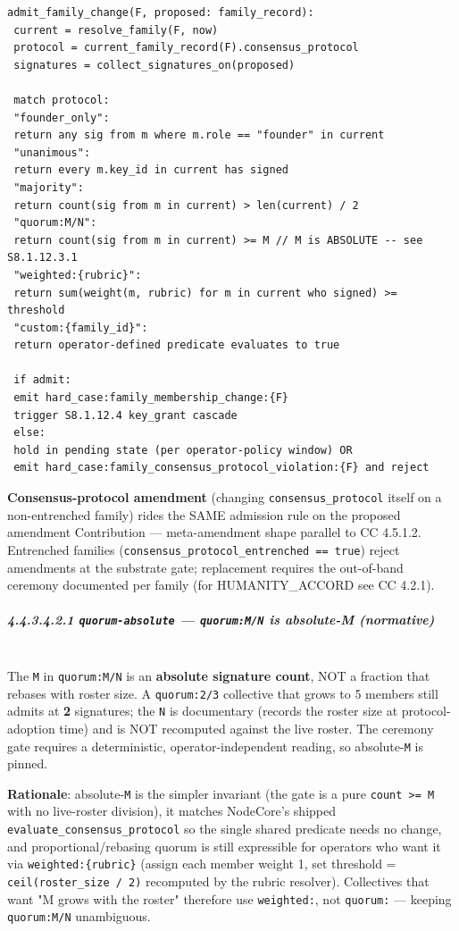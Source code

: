\documentclass[11pt]{article}
\begin{document}
\begin{lstlisting}
admit_family_change(F, proposed: family_record):
 current = resolve_family(F, now)
 protocol = current_family_record(F).consensus_protocol
 signatures = collect_signatures_on(proposed)

 match protocol:
 "founder_only":
 return any sig from m where m.role == "founder" in current
 "unanimous":
 return every m.key_id in current has signed
 "majority":
 return count(sig from m in current) > len(current) / 2
 "quorum:M/N":
 return count(sig from m in current) >= M // M is ABSOLUTE -- see S8.1.12.3.1
 "weighted:{rubric}":
 return sum(weight(m, rubric) for m in current who signed) >= threshold
 "custom:{family_id}":
 return operator-defined predicate evaluates to true

 if admit:
 emit hard_case:family_membership_change:{F}
 trigger S8.1.12.4 key_grant cascade
 else:
 hold in pending state (per operator-policy window) OR
 emit hard_case:family_consensus_protocol_violation:{F} and reject
\end{lstlisting}

\textbf{Consensus-protocol amendment} (changing \texttt{consensus\_protocol} itself on a non-entrenched family) rides the SAME admission rule on the proposed amendment Contribution — meta-amendment shape parallel to CC 4.5.1.2. Entrenched families (\texttt{consensus\_protocol\_entrenched == true}) reject amendments at the substrate gate; replacement requires the out-of-band ceremony documented per family (for HUMANITY\_ACCORD see CC 4.2.1).


\subparagraph{4.4.3.4.2.1 \texttt{quorum-absolute} — \texttt{quorum:M/N} is absolute-M (normative)}\mbox{}\\


The \texttt{M} in \texttt{quorum:M/N} is an \textbf{absolute signature count}, NOT a fraction that rebases with roster size. A \texttt{quorum:2/3} collective that grows to 5 members still admits at \textbf{2} signatures; the \texttt{N} is documentary (records the roster size at protocol-adoption time) and is NOT recomputed against the live roster. The ceremony gate requires a deterministic, operator-independent reading, so absolute-\texttt{M} is pinned.


\textbf{Rationale}: absolute-\texttt{M} is the simpler invariant (the gate is a pure \texttt{count >= M} with no live-roster division), it matches NodeCore's shipped \texttt{evaluate\_consensus\_protocol} so the single shared predicate needs no change, and proportional/rebasing quorum is still expressible for operators who want it via \texttt{weighted:\{rubric\}} (assign each member weight 1, set threshold = \texttt{ceil(roster\_size / 2)} recomputed by the rubric resolver). Collectives that want "M grows with the roster" therefore use \texttt{weighted:}, not \texttt{quorum:} — keeping \texttt{quorum:M/N} unambiguous.
\end{document}
